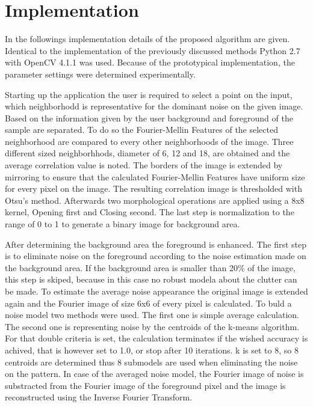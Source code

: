 \documentclass[draft,final]{vutinfth} %
\begin{document}
\section{Implementation}
\par
In the followings implementation details of the proposed algorithm are given.
Identical to the implementation of the previously discussed methods Python 2.7 \cite{van1995python} with OpenCV 4.1.1 \cite{opencv_library} was used.
Because of the prototypical implementation, the parameter settings were determined experimentally.
\par
Starting up the application the user is required to select a point on the input, which neighborhodd is representative for the dominant noise on the given image.
Based on the information given by the user background and foreground of the sample are separated.
To do so the Fourier-Mellin Features of the selected neighborhood are compared to every other neighborhoods of the image.
Three different sized neighborhhods, diameter of 6, 12 and 18, are obtained and the average correlation value is noted.
The borders of the image is extended by mirroring to ensure that the calculated Fourier-Mellin Features have uniform size for every pixel on the image.
The resulting correlation image is thresholded with Otsu's method.
Afterwards two morphological operations are applied using a 8x8 kernel, Opening first and Closing second.
The last step is normalization to the range of 0 to 1 to generate a binary image for background area.
\par
After determining the background area the foreground is enhanced.
The first step is to eliminate noise on the foreground according to the noise estimation made on the background area.
If the background area is smaller than 20\% of the image, this step is skiped, because in this case no robust modela about the clutter can be made.
To estimate the average noise appearance the original image is extended again and the Fourier image of size 6x6 of every pixel is calculated.
To buld a noise model two methods were used.
The first one is simple average calculation.
The second one is representing noise by the centroids of the k-means algorithm.
For that double criteria is set, the calculation terminates if the wished accuracy is achived, that is however set to 1.0, or stop after 10 iterations.
k is set to 8, so 8 centroids are determined thus 8 submodels are used when eliminating the noise on the pattern.
In case of the averaged noise model, the Fourier image of noise is substracted from the Fourier image of the foreground pixel and the image is reconstructed using the Inverse Fourier Transform.
\end{document}
